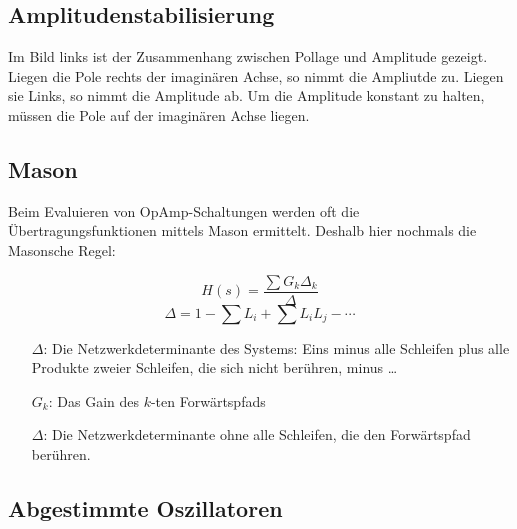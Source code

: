 \subsection{Amplitudenstabilisierung}
\begin{minipage}{0.5\columnwidth}
    
\end{minipage}
\hfill
\begin{minipage}{0.49\columnwidth}
    Im Bild links ist der Zusammenhang zwischen Pollage und Amplitude gezeigt. 
    Liegen die Pole rechts der imaginären Achse, so nimmt die Ampliutde zu.
    Liegen sie Links, so nimmt die Amplitude ab. 
    Um die Amplitude konstant zu halten, müssen die Pole auf der imaginären Achse liegen.
\end{minipage}

\subsection{Mason}
Beim Evaluieren von OpAmp-Schaltungen werden oft die Übertragungsfunktionen mittels Mason ermittelt.
Deshalb hier nochmals die Masonsche Regel:

\begin{minipage}{0.4\columnwidth}
    \begin{equation*}
        H(s) = \frac{\sum G_k \Delta_k}{\Delta}
    \end{equation*}
    \begin{equation*}
        \Delta = 1 - \sum L_i + \sum L_i L_j - \cdots
    \end{equation*}
\end{minipage}
\hfill
\begin{minipage}{0.55\columnwidth}
    \begin{itemize}
        \item[$\Delta$:] Die Netzwerkdeterminante des Systems: 
            Eins minus alle Schleifen plus alle Produkte zweier Schleifen, die sich nicht berühren, minus \dots
        \item[$G_k$:] Das Gain des $k$-ten Forwärtspfads
        \item[$\Delta$:] Die Netzwerkdeterminante ohne alle Schleifen, die den Forwärtspfad berühren.
    \end{itemize}
\end{minipage}

\subsection{Abgestimmte Oszillatoren}
